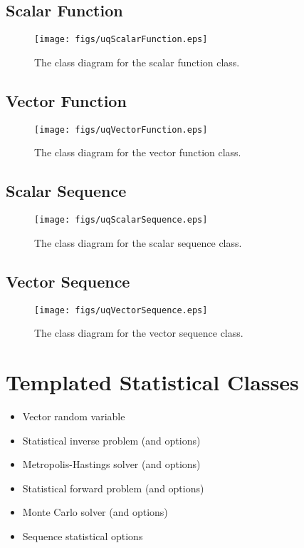 \clearpage
\subsection{Scalar Function}

\begin{figure}[h!]
\centerline{
\texttt{[image: figs/uqScalarFunction.eps]}
}
\caption{
The class diagram for the scalar function class.
}
\label{fig-scalar-function-class}
\end{figure}

\clearpage
\subsection{Vector Function}

\begin{figure}[h!]
\centerline{
\texttt{[image: figs/uqVectorFunction.eps]}
}
\caption{
The class diagram for the vector function class.
}
\label{fig-vector-function-class}
\end{figure}

\clearpage
\subsection{Scalar Sequence}

\begin{figure}[h!]
\centerline{
\texttt{[image: figs/uqScalarSequence.eps]}
}
\caption{
The class diagram for the scalar sequence class.
}
\label{fig-scalar-sequence-class}
\end{figure}

\clearpage
\subsection{Vector Sequence}

\begin{figure}[h!]
\centerline{
\texttt{[image: figs/uqVectorSequence.eps]}
}
\caption{
The class diagram for the vector sequence class.
}
\label{fig-vector-sequence-class}
\end{figure}

\clearpage
\section{Templated Statistical Classes}

\begin{itemize}
\item Vector random variable
\item Statistical inverse problem (and options)
\item Metropolis-Hastings solver (and options)
\item Statistical forward problem (and options)
\item Monte Carlo solver (and options)
\item Sequence statistical options
\end{itemize}

